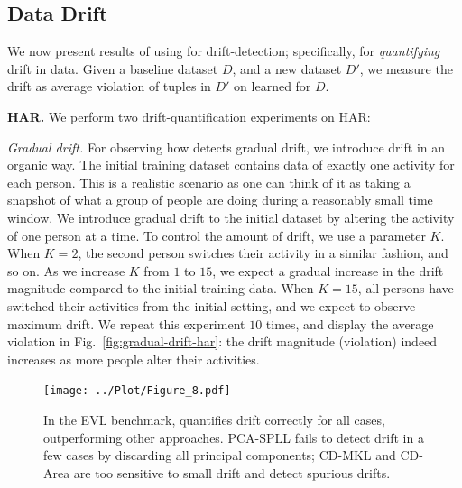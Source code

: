 \smallskip

\subsection{Data Drift}\label{exp-invariants-for-drift}
%
We now present results of using \dis for drift-detection; specifically, for
\emph{quantifying} drift in data. Given a baseline dataset $D$, and a new
dataset $D'$, we measure the drift as average violation of tuples in $D'$ on
\dis learned for $D$.

\smallskip

\noindent\textbf{HAR.} We perform two drift-quantification experiments on
HAR:

\smallskip

\noindent \emph{Gradual drift.}  For observing how \system detects
gradual drift, we introduce drift in an organic way. The initial training
dataset contains data of exactly one activity for each person. This is a
realistic scenario as one can think of it as taking a snapshot of what a group
of people are doing during a reasonably small time window. We introduce gradual
drift to the initial dataset by altering the activity of one person at a time.
To control the amount of drift, we use a parameter $K$.  When $K = 2$, the
second person switches their activity in a similar fashion, and so on. As we
increase $K$ from $1$ to $15$, we expect a gradual increase in the drift
magnitude compared to the initial training data. When $K = 15$, all persons
have switched their activities from the initial setting, and we expect to
observe maximum drift. We repeat this experiment $10$ times, and display the
average \invariant violation in Fig.~\ref{fig:gradual-drift-har}: the drift
magnitude (violation) indeed increases as more people alter their activities.

\begin{figure}[t]
	\centering	
	\texttt{[image: ../Plot/Figure\_8.pdf]}	
		\vspace{-5mm}
	 \caption{In the EVL benchmark, \system quantifies drift correctly for all
	 cases, outperforming other approaches. PCA-SPLL fails to detect drift in a few cases by
 	 discarding all principal components; CD-MKL and CD-Area are too sensitive to
 	 small drift and detect spurious drifts.}
	\vspace{-2mm}
	\label{fig:drift-baseline-comparison-EVL}
\end{figure}

